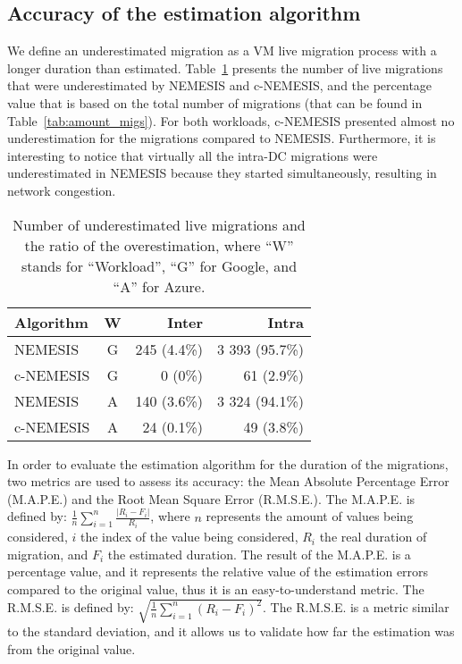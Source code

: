  \subsection{Accuracy of the estimation algorithm}
 
 We define an underestimated migration as a VM live migration process with a longer duration than estimated. Table~\ref{tab:migs_under} presents the number of live migrations that were underestimated by NEMESIS and c-NEMESIS, and the percentage value that is based on the total number of migrations (that can be found in Table~\ref{tab:amount_migs}). For both workloads, c-NEMESIS presented almost no underestimation for the migrations compared to NEMESIS. Furthermore, it is interesting to notice that virtually all the intra-DC migrations were underestimated in NEMESIS because they started simultaneously, resulting in network congestion.
 
\begin{table}[!ht]
\caption{Number of underestimated live migrations and the ratio of the overestimation, where ``W'' stands for ``Workload'', ``G'' for Google, and ``A'' for Azure.}\label{tab:migs_under} \centering
\begin{tabular}{|l|c|r|r|}
  \hline
  \textbf{Algorithm} & \textbf{W}  & \textbf{Inter} & \textbf{Intra}   \\
  \hline
  NEMESIS  & G & 245 (4.4\%)   & 3 393 (95.7\%) \\
  \hline
  c-NEMESIS & G & 0 (0\%)  & 61 (2.9\%) \\
  \hline
  NEMESIS & A & 140 (3.6\%)   &  3 324 (94.1\%)   \\
  \hline
  c-NEMESIS & A & 24 (0.1\%)   & 49 (3.8\%) \\
  \hline  
\end{tabular}
\end{table}


In order to evaluate the estimation algorithm for the duration of the migrations, two metrics are used to assess its accuracy: the Mean Absolute Percentage Error (M.A.P.E.) and the Root Mean Square Error (R.M.S.E.). The M.A.P.E. is defined by: $ \frac{1}{n}\sum_{i=1}^{n}  \frac{| R_{i} - F_{i}|}{R_{i}}$, where $n$ represents the amount of values being considered, $i$ the index of the value being considered, $R_{i}$ the real duration of migration, and $F_{i}$ the estimated duration. The result of the M.A.P.E. is a percentage value, and it represents the relative value of the estimation errors compared to the original value, thus it is an easy-to-understand metric. The R.M.S.E. is defined by: $\sqrt{ \frac{1}{n}\sum_{i=1}^{n}  (R_{i} - F_{i})^2}$. The R.M.S.E. is a metric similar to the standard deviation, and it allows us to validate how far the estimation was from the original value.

